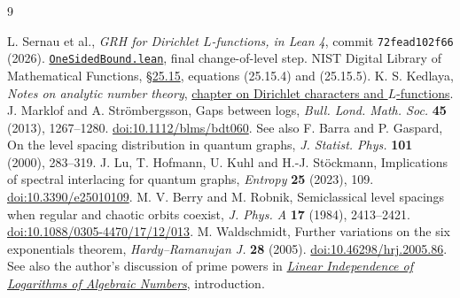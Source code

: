\documentclass[11pt]{article}
\begin{document}
\begin{thebibliography}{9}\footnotesize\setlength{\itemsep}{1.5pt}\setlength{\parskip}{0pt}\raggedright
{} L. Sernau et al., \emph{GRH for Dirichlet $L$-functions, in Lean 4},
commit \texttt{72fead102f66} (2026).
\href{https://github.com/lsernau/grh-lean/blob/72fead102f663d5c7a407964a13dc0cf9d977207/grh/src/New/Reduction/OneSidedBound.lean}{\texttt{OneSidedBound.lean}}, final change-of-level step.
 NIST Digital Library of Mathematical Functions,
\href{https://dlmf.nist.gov/25.15}{\S25.15}, equations (25.15.4) and (25.15.5).
 K. S. Kedlaya, \emph{Notes on analytic number theory},
\href{https://kskedlaya.org/ant/chap-lfunc.html}{chapter on Dirichlet characters and $L$-functions}.
 J. Marklof and A. Str\"ombergsson, Gaps between logs,
\emph{Bull. Lond. Math. Soc.} \textbf{45} (2013), 1267--1280.
\href{https://doi.org/10.1112/blms/bdt060}{doi:10.1112/blms/bdt060}. See also
F. Barra and P. Gaspard, On the level spacing distribution in quantum graphs,
\emph{J. Statist. Phys.} \textbf{101} (2000), 283--319.
 J. Lu, T. Hofmann, U. Kuhl and H.-J. St\"ockmann, Implications of
spectral interlacing for quantum graphs, \emph{Entropy} \textbf{25} (2023), 109.
\href{https://doi.org/10.3390/e25010109}{doi:10.3390/e25010109}.
 M. V. Berry and M. Robnik, Semiclassical level spacings when
regular and chaotic orbits coexist, \emph{J. Phys. A} \textbf{17} (1984), 2413--2421.
\href{https://doi.org/10.1088/0305-4470/17/12/013}{doi:10.1088/0305-4470/17/12/013}.
 M. Waldschmidt, Further variations on the six exponentials theorem,
\emph{Hardy--Ramanujan J.} \textbf{28} (2005).
\href{https://doi.org/10.46298/hrj.2005.86}{doi:10.46298/hrj.2005.86}.
See also the author's discussion of prime powers in
\href{https://webusers.imj-prg.fr/~michel.waldschmidt/articles/pdf/LIL.pdf}{\emph{Linear Independence of Logarithms of Algebraic Numbers}}, introduction.
\end{thebibliography}
\end{document}
